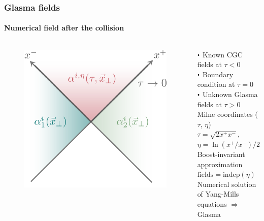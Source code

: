 \documentclass[aspectratio=169,11pt,usenames,dvipsnames]{beamer}
\newcommand\sbullet[1][.5]{\mathbin{\vcenter{\hbox{\scalebox{#1}{$\bullet$}}}}}
\begin{document}

\begin{frame}[noframenumbering]
    \frametitle{Glasma fields}
    \framesubtitle{Numerical field after the collision}
    \begin{columns}[onlytextwidth,t]
       \begin{figure}
            \centering
            \includegraphics[width=0.85\columnwidth]{images/cgc_col.png}
            \captionsetup{justification=centering}
        \end{figure}
        \vspace{0.2cm}
        \begin{center}
            {\color{customgreen}$\sbullet[0.6]$ Known CGC fields} at $\tau<0$ \\[0.1cm]
            {\color{destacado}$\sbullet[0.6]$ Boundary condition} at $\tau=0$ \\[0.1cm]
            {\color{custompink}$\sbullet[0.6]$ Unknown Glasma fields} at $\tau>0$ \\[0.5cm]
            {\scriptsize{\color{lightgray}Milne coordinates ($\tau$, $\eta$)} \\
            {\color{lightgray}$\tau=\sqrt{2 x^+x^-}$, $\eta=\ln(x^+/x^-)/2$}\\[0.4cm]
            {\color{lightgray}Boost-invariant approximation $\mathrm{fields}=\mathrm{indep}(\eta)$} \\[0.3cm]
            {\color{lightgray}Numerical solution of Yang-Mills}\\[-0.15cm] {\color{lightgray}equations $\Rightarrow$ Glasma\footnotemark}}
        \end{center}
    \end{columns}
\end{frame}
\end{document}
